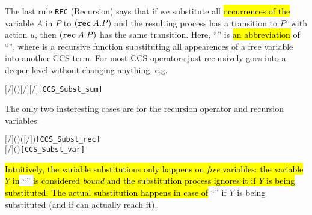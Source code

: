 The last rule \texttt{REC} (Recursion)
 says that if we substitute all \hl{occurrences of the} variable $A$ in $P$ to
$({\tt rec}\: A . P)$ and the resulting process has a transition to $P'$
with action $u$, then $({\tt rec}\: A . P)$ has the same
transition. Here, ``'' is \hl{an abbreviation}
of ``'', where  is a
recursive function substituting all appearences of a free variable
into another CCS term.
For most CCS operators  just recursively goes into a deeper
level without changing anything, e.g.
\begin{alltt}
\HOLTokenTurnstile{} \ensuremath{[}\ensuremath{/}\ensuremath{]} \ensuremath{(} \HOLSymConst{\ensuremath{+}} \ensuremath{)} \HOLSymConst{\ensuremath{=}} \ensuremath{[}\ensuremath{/}\ensuremath{]}  \HOLSymConst{\ensuremath{+}} \ensuremath{[}\ensuremath{/}\ensuremath{]} \hfill{[CCS_Subst_sum]}
\end{alltt}
The only two insteresting cases are for the recursion operator and
recursion variables:
\begin{alltt}
\HOLTokenTurnstile{} \ensuremath{[}\ensuremath{/}\ensuremath{]} \ensuremath{(}  \ensuremath{)} \HOLSymConst{\ensuremath{=}}   \HOLSymConst{\ensuremath{=}}         \ensuremath{(}\ensuremath{[}\ensuremath{/}\ensuremath{]} \ensuremath{)}\hfill{[CCS_Subst_rec]}
\HOLTokenTurnstile{} \ensuremath{[}\ensuremath{/}\ensuremath{]} \ensuremath{(} \ensuremath{)} \HOLSymConst{\ensuremath{=}}   \HOLSymConst{\ensuremath{=}}      \hfill{[CCS_Subst_var]}
\end{alltt}
\hl{Intuitively, the variable substitutions only happens on \emph{free}
variables: the variable $Y$ in} ``'' \hl{is
considered \emph{bound} and the substitution process ignores it if $Y$ is
being substituted. The actual substitution happens in case of}
``'' if $Y$ is being substituted (and if 
can actually reach it).

